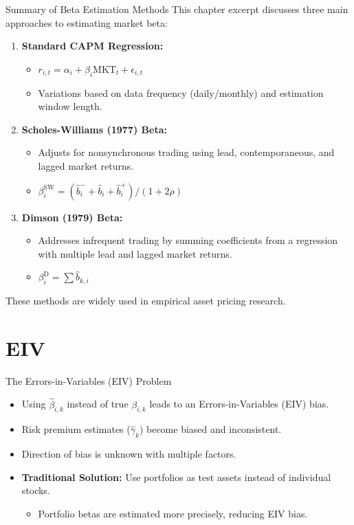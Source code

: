 \documentclass[10pt]{beamer}
\begin{document}
\begin{frame}{Summary of Beta Estimation Methods}
  This chapter excerpt discusses three main approaches to estimating market beta:
  \begin{enumerate}
    \item \textbf{Standard CAPM Regression:}
    \begin{itemize}
        \item $r_{i,t} = \alpha_i + \beta_i \text{MKT}_t + \epsilon_{i,t}$
        \item Variations based on data frequency (daily/monthly) and estimation window length.
    \end{itemize}
    \item \textbf{Scholes-Williams (1977) Beta:}
    \begin{itemize}
        \item Adjusts for nonsynchronous trading using lead, contemporaneous, and lagged market returns.
        \item $\beta_i^{\text{SW}} = (\hat{b}_i^{-} + \hat{b}_i + \hat{b}_i^{+}) / (1 + 2\rho)$
    \end{itemize}
    \item \textbf{Dimson (1979) Beta:}
    \begin{itemize}
        \item Addresses infrequent trading by summing coefficients from a regression with multiple lead and lagged market returns.
        \item $\beta_i^{\text{D}} = \sum \hat{b}_{k,i}$
    \end{itemize}
  \end{enumerate}
  These methods are widely used in empirical asset pricing research.
\end{frame}

\section{EIV}


\begin{frame}{The Errors-in-Variables (EIV) Problem}
  \begin{itemize}
    \item Using $\hat{\beta}_{i,k}$ instead of true $\beta_{i,k}$ leads to an Errors-in-Variables (EIV) bias.
    \item Risk premium estimates ($\hat{\gamma}_k$) become biased and inconsistent.
    \item Direction of bias is unknown with multiple factors.
    \item \textbf{Traditional Solution:} Use portfolios as test assets instead of individual stocks.
    \begin{itemize}
        \item Portfolio betas are estimated more precisely, reducing EIV bias.
    \end{itemize}
  \end{itemize}
\end{frame}
\end{document}
